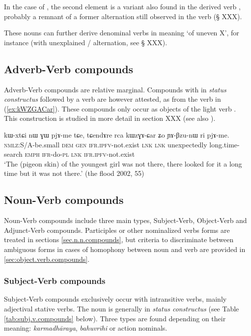 In the case of , the second element  is a variant also found in the derived verb , probably a remnant of a former  alternation still observed in the verb   (§ XXX).

These nouns can further derive denominal verbs in  meaning `of uneven X', for instance     (with unexplained  /  alternation, see § XXX).

\subsection{Adverb-Verb compounds} \label{sec.adv.v.compounds}
Adverb-Verb compounds are relative marginal. Compounds with  in \textit{status constructus}  followed by a verb are however attested, as  from the verb  in (\ref{ex:kWZGACar}). These compounds only occur as objects of the light verb . This construction is studied in more detail in section XXX (see also \citealt[252]{jacques16complementation}).

\begin{exe}
\ex \label{ex:kWZGACar}
\gll kɯ-xtɕi nɯ ɣɯ pjɤ-me tɕe, tɕendɤre rca kɯzɣɤ-ɕar ʑo ɲɤ-βzu-nɯ ri pjɤ-me.\\
\textsc{nmlz}:S/A-be.small \textsc{dem} \textsc{gen} \textsc{ifr}.\textsc{ipfv}-not.exist \textsc{lnk} \textsc{lnk} unexpectedly long.time-search \textsc{emph} \textsc{ifr}-do-\textsc{pl}  \textsc{lnk} \textsc{ifr}.\textsc{ipfv}-not.exist \\
\glt `The (pigeon skin) of the youngest girl was not there, there looked for it a long time but it was not there.' (the flood 2002, 55)
\end{exe}

\subsection{Noun-Verb compounds} \label{sec.n.v.compounds}
Noun-Verb compounds include three main types, Subject-Verb, Object-Verb and Adjunct-Verb compounds. Participles or other nominalized verbs forms are treated in sections \ref{sec.n.n.compounds}, but criteria to discriminate between ambiguous forms in cases of homophony between noun and verb are provided in \ref{sec:object.verb.compounds}.

\subsubsection{Subject-Verb compounds} \label{sec:subject.verb.compounds}
Subject-Verb compounds exclusively occur with intransitive verbs, mainly adjectival stative verbs. The noun is generally in \textit{status constructus} (see Table \ref{tab:subj.v.compounds} below). Three types are found depending on their meaning: \textit{karmadhāraya}, \textit{bahuvrīhi} or action nominals.

